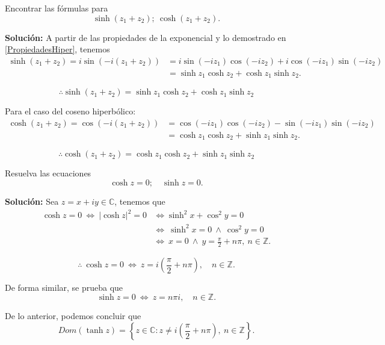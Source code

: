 \begin{ejemplo}
Encontrar las fórmulas para 
$$\sinh(z_1 + z_2); ~ \cosh(z_1+z_2).$$

\textbf{Solución:} A partir de las propiedades de la exponencial y lo demostrado en \eqref{PropiedadesHiper}, tenemos 
\begin{align*}
\sinh(z_1 + z_2) = i \sin(-i(z_1 + z_2)) &= i \sin(-iz_1)\cos(-iz_2) + i \cos(-iz_1)\sin(-iz_2)  \\
&= \sinh z_1 \cosh z_2 + \cosh z_1 \sinh z_2.
\end{align*}

$$\boxed{\therefore \sinh(z_1 + z_2) = \sinh z_1 \cosh z_2 + \cosh z_1 \sinh z_2}$$ 

Para el caso del coseno hiperbólico:
\begin{align*}
\cosh(z_1 + z_2) = \cos(-i(z_1 + z_2)) &= \cos(-iz_1) \cos(-iz_2) - \sin(-iz_1) \sin(-iz_2) \\
&=  \cosh z_1 \cosh z_2 + \sinh z_1 \sinh z_2.
\end{align*}

$$\boxed{ \therefore \cosh(z_1 + z_2) =  \cosh z_1 \cosh z_2 + \sinh z_1 \sinh z_2}$$
\end{ejemplo}

\begin{ejemplo}
Resuelva las ecuaciones 
$$\cosh z = 0; \quad \sinh z = 0.$$

\textbf{Solución:} Sea $z = x+iy \in \mathbb{C}$, tenemos que 
\begin{align*}
\cosh z = 0 ~\Leftrightarrow~ |\cosh z|^2 = 0 &\Leftrightarrow \sinh^2 x + \cos^2 y = 0 \\
&\Leftrightarrow~ \sinh^2 x = 0 ~\wedge~ \cos^2 y = 0 \\
 &\Leftrightarrow~  x = 0 ~\wedge~  y = \frac{\pi}{2} + n\pi, ~ n \in \mathbb{Z} .
\end{align*}

$$\therefore ~ \cosh z = 0 ~\Leftrightarrow~ z = i\left(\frac{\pi}{2} + n\pi\right), \quad n \in \mathbb{Z}.$$

De forma similar, se prueba que 
$$\sinh z = 0 ~\Leftrightarrow~ z = n \pi i, \quad n \in \mathbb{Z}.$$ 

\end{ejemplo}

De lo anterior, podemos concluir que
\begin{equation*}
Dom(\tanh z) = \left\{z \in \mathbb{C}: z \neq i\left(\frac{\pi}{2} + n\pi\right), ~ n \in \mathbb{Z}  \right\}.
\end{equation*}

